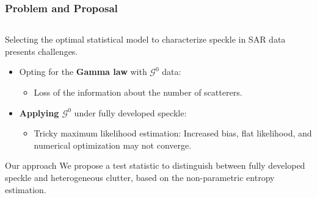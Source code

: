 \documentclass[aspectratio=1610,10pt]{beamer}
\begin{document}
\begin{frame}

\end{frame} 
\begin{frame} \frametitle{\large{Problem and Proposal}}\vspace{0.4cm}	

 \justifying
\begin{columns}[T,onlytextwidth]
    \begin{column}{.8\textwidth}
			\begin{exampleblock}{}\justifying
Selecting the optimal statistical model to characterize speckle in SAR data presents challenges. 
\pause
\begin{itemize}
    \item Opting for the \textbf{Gamma law }with $\mathcal{G}^0$ data:
    \begin{itemize}
        \item Loss of the information about the number of scatterers.
    \end{itemize}
		\pause
    \item \textbf{Applying $\mathcal{G}^0$} under fully developed speckle:
    \begin{itemize}
        \item Tricky maximum likelihood estimation:
       Increased bias, flat likelihood, and numerical optimization may not
converge.
        
    \end{itemize}
\end{itemize}
		 
	\end{exampleblock}
	\pause
	\begin{exampleblock}{Our approach}\vspace{0.2cm}	
	\justifying
		\textcolor[rgb]{0,0,0.55}{ We propose a test statistic to distinguish between fully developed speckle and heterogeneous clutter, based on the non-parametric entropy estimation}.


	\end{exampleblock}
		
    \end{column}
    
\end{columns}\vspace{0.2cm}


\end{frame} 
\end{document}
